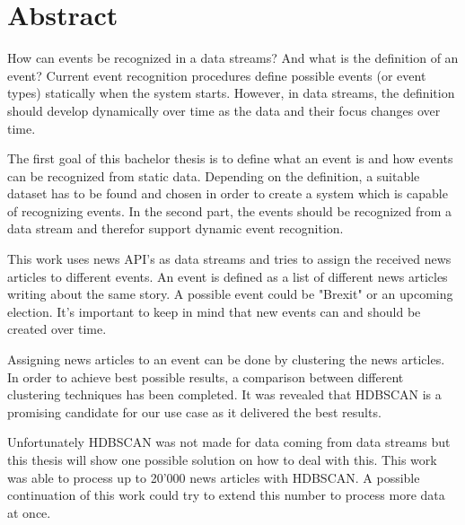 
\section{Abstract}

How can events be recognized in a data streams?
And what is the definition of an event?
Current event recognition procedures define possible events (or event types) statically when the system starts.
However, in data streams, the definition should develop dynamically over time as the data and their focus changes over time.

The first goal of this bachelor thesis is to define what an event is and how events can be recognized from static data.
Depending on the definition, a suitable dataset has to be found and chosen in order to create a system
which is capable of recognizing events.
In the second part, the events should be recognized from a data stream and therefor support dynamic event recognition.

This work uses news API's as data streams and tries to assign the received news articles to different events.
An event is defined as a list of different news articles writing about the same story.
A possible event could be "Brexit" or an upcoming election.
It's important to keep in mind that new events can and should be created over time.

Assigning news articles to an event can be done by clustering the news articles.
In order to achieve best possible results, a comparison between different clustering techniques has been completed.
It was revealed that HDBSCAN is a promising candidate for our use case as it delivered the best results.

Unfortunately HDBSCAN was not made for data coming from data streams but this thesis will show
one possible solution on how to deal with this.
This work was able to process up to 20'000 news articles with HDBSCAN.
A possible continuation of this work could try to extend this number to process more data at once.

